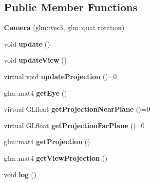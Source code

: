 \subsection*{Public Member Functions}
\begin{DoxyCompactItemize}
\item 
\hypertarget{classfillwave_1_1space_1_1Camera_a489acd9c53c9bf0ab1311f2f2bcbd9c2}{}{\bfseries Camera} (glm\+::vec3, glm\+::quat rotation)\label{classfillwave_1_1space_1_1Camera_a489acd9c53c9bf0ab1311f2f2bcbd9c2}

\item 
\hypertarget{classfillwave_1_1space_1_1Camera_af170db347337473a1bfa347b82382cb1}{}void {\bfseries update} ()\label{classfillwave_1_1space_1_1Camera_af170db347337473a1bfa347b82382cb1}

\item 
\hypertarget{classfillwave_1_1space_1_1Camera_afd6f6eedf3986d75a1d15d271c88487d}{}void {\bfseries update\+View} ()\label{classfillwave_1_1space_1_1Camera_afd6f6eedf3986d75a1d15d271c88487d}

\item 
\hypertarget{classfillwave_1_1space_1_1Camera_a27d676adb7717651a7e3df728b0b2b22}{}virtual void {\bfseries update\+Projection} ()=0\label{classfillwave_1_1space_1_1Camera_a27d676adb7717651a7e3df728b0b2b22}

\item 
\hypertarget{classfillwave_1_1space_1_1Camera_a87023799e2e42da3e30065ab6be94a8c}{}glm\+::mat4 {\bfseries get\+Eye} ()\label{classfillwave_1_1space_1_1Camera_a87023799e2e42da3e30065ab6be94a8c}

\item 
\hypertarget{classfillwave_1_1space_1_1Camera_a5a0f1ebf0f65f7f83f756ea988a39c92}{}virtual G\+Lfloat {\bfseries get\+Projection\+Near\+Plane} ()=0\label{classfillwave_1_1space_1_1Camera_a5a0f1ebf0f65f7f83f756ea988a39c92}

\item 
\hypertarget{classfillwave_1_1space_1_1Camera_af7add57b3cd9e81bc6676f3d8fc775ca}{}virtual G\+Lfloat {\bfseries get\+Projection\+Far\+Plane} ()=0\label{classfillwave_1_1space_1_1Camera_af7add57b3cd9e81bc6676f3d8fc775ca}

\item 
\hypertarget{classfillwave_1_1space_1_1Camera_a3dbf83303efcfd8d9a8bc76b28b23957}{}glm\+::mat4 {\bfseries get\+Projection} ()\label{classfillwave_1_1space_1_1Camera_a3dbf83303efcfd8d9a8bc76b28b23957}

\item 
\hypertarget{classfillwave_1_1space_1_1Camera_a89d29e12b5c97a62eb3e61b970e4b757}{}glm\+::mat4 {\bfseries get\+View\+Projection} ()\label{classfillwave_1_1space_1_1Camera_a89d29e12b5c97a62eb3e61b970e4b757}

\item 
\hypertarget{classfillwave_1_1space_1_1Camera_a4b7c389534ba96e994075012b9b286df}{}void {\bfseries log} ()\label{classfillwave_1_1space_1_1Camera_a4b7c389534ba96e994075012b9b286df}

\end{DoxyCompactItemize}
